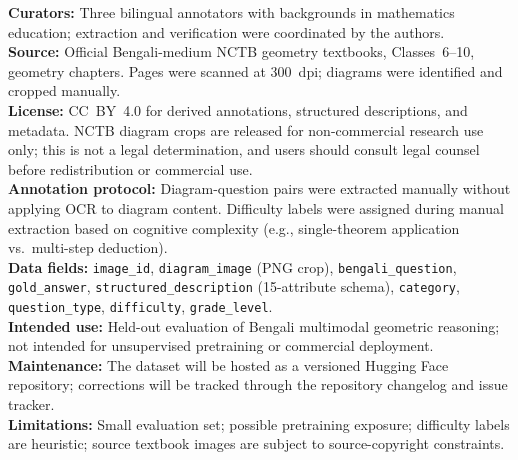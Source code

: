 \documentclass[11pt]{article}
\begin{document}
\begin{tcolorbox}[breakable, colback=yellow!8, colframe=yellow!45!black, title=NCTB-500: Data Card, fonttitle=\bfseries]
\small
\textbf{Curators:} Three bilingual annotators with backgrounds in mathematics education; extraction and verification were coordinated by the authors. \\
\textbf{Source:} Official Bengali-medium NCTB geometry textbooks, Classes~6--10, geometry chapters. Pages were scanned at 300~dpi; diagrams were identified and cropped manually. \\
\textbf{License:} CC~BY~4.0 for derived annotations, structured descriptions, and metadata. NCTB diagram crops are released for non-commercial research use only; this is not a legal determination, and users should consult legal counsel before redistribution or commercial use. \\
\textbf{Annotation protocol:} Diagram-question pairs were extracted manually without applying OCR to diagram content. Difficulty labels were assigned during manual extraction based on cognitive complexity (e.g., single-theorem application vs.\ multi-step deduction). \\
\textbf{Data fields:} \texttt{image\_id}, \texttt{diagram\_image} (PNG crop), \texttt{bengali\_question}, \texttt{gold\_answer}, \texttt{structured\_description} (15-attribute schema), \texttt{category}, \texttt{question\_type}, \texttt{difficulty}, \texttt{grade\_level}. \\
\textbf{Intended use:} Held-out evaluation of Bengali multimodal geometric reasoning; not intended for unsupervised pretraining or commercial deployment. \\
\textbf{Maintenance:} The dataset will be hosted as a versioned Hugging Face repository; corrections will be tracked through the repository changelog and issue tracker. \\
\textbf{Limitations:} Small evaluation set; possible pretraining exposure; difficulty labels are heuristic; source textbook images are subject to source-copyright constraints.
\end{tcolorbox}
\end{document}
